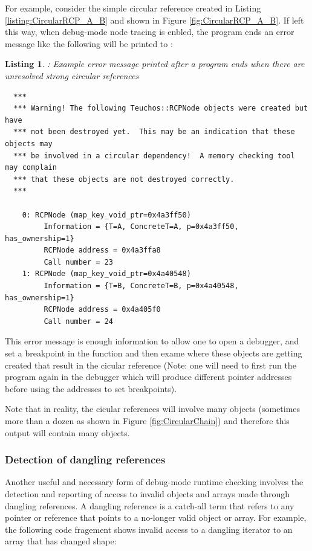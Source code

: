\documentclass[pdf,ps2pdf,11pt]{SANDreport}
\newtheorem{listing}{Listing}
\begin{document}
For example, consider the simple circular reference created in Listing
{}\ref{listing:CircularRCP_A_B} and shown in Figure
{}\ref{fig:CircularRCP_A_B}.  If left this way, when debug-mode node
tracing is enbled, the program ends an error message like the
following will be printed to {}:


{}\begin{listing}: Example error message printed after a program ends
when there are unresolved strong circular references
\label{listing:curcular-ref-error-msg}
{\small\begin{verbatim}
  ***
  *** Warning! The following Teuchos::RCPNode objects were created but have
  *** not been destroyed yet.  This may be an indication that these objects may
  *** be involved in a circular dependency!  A memory checking tool may complain
  *** that these objects are not destroyed correctly.
  ***
  
    0: RCPNode (map_key_void_ptr=0x4a3ff50)
         Information = {T=A, ConcreteT=A, p=0x4a3ff50, has_ownership=1}
         RCPNode address = 0x4a3ffa8
         Call number = 23
    1: RCPNode (map_key_void_ptr=0x4a40548)
         Information = {T=B, ConcreteT=B, p=0x4a40548, has_ownership=1}
         RCPNode address = 0x4a405f0
         Call number = 24
\end{verbatim}}
\end{listing}


This error message is enough information to allow one to open a
debugger, and set a breakpoint in the function
{} and then exame where these
objects are getting created that result in the cicular reference
(Note: one will need to first run the program again in the debugger
which will produce different pointer addresses before using the
addresses to set breakpoints).

Note that in reality, the cicular references will involve many objects
(sometimes more than a dozen as shown in Figure
{}\ref{fig:CircularChain}) and therefore this output will contain many
{} objects.


%
{}\subsubsection{Detection of dangling references}
\label{sec:detection-dangling-references}
%

Another useful and necessary form of debug-mode runtime checking
involves the detection and reporting of access to invalid objects and
arrays made through dangling references.  A dangling reference is a
catch-all term that refers to any pointer or reference that points to
a no-longer valid object or array.  For example, the following code
fragement shows invalid access to a dangling iterator to an array that
has changed shape:
\end{document}
